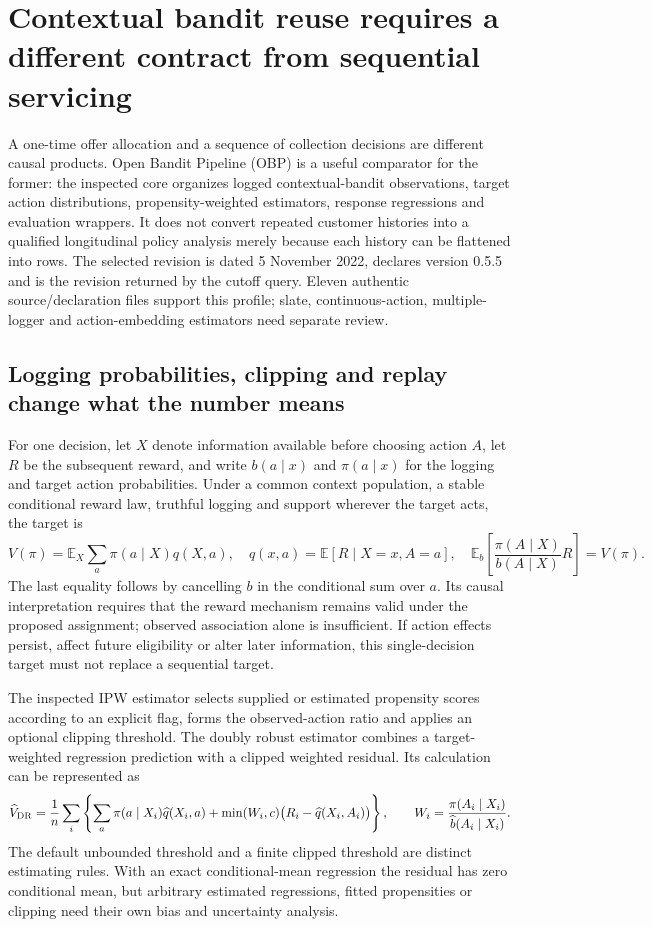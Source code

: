 \section{Contextual bandit reuse requires a different contract from sequential servicing}
\label{exec23:obp-scope}
A one-time offer allocation and a sequence of collection decisions are different
causal products. Open Bandit Pipeline (OBP) is a useful comparator for the former:
the inspected core organizes logged contextual-bandit observations, target
action distributions, propensity-weighted estimators, response regressions and
evaluation wrappers. It does not convert repeated customer histories into a
qualified longitudinal policy analysis merely because each history can be
flattened into rows. The selected revision is dated 5 November 2022, declares
version 0.5.5 and is the revision returned by the cutoff query. Eleven authentic
source/declaration files support this profile; slate, continuous-action,
multiple-logger and action-embedding estimators need separate review.
\citep{exec23_obp_sources}

\subsection{Logging probabilities, clipping and replay change what the number means}
\label{exec23:obp-target}
For one decision, let $X$ denote information available before choosing action
$A$, let $R$ be the subsequent reward, and write $b(a\mid x)$ and
$\pi(a\mid x)$ for the logging and target action probabilities. Under a common
context population, a stable conditional reward law, truthful logging and
support wherever the target acts, the target is
\[
 V(\pi)=\mathbb E_X\sum_a\pi(a\mid X)q(X,a),
 \quad q(x,a)=\mathbb E[R\mid X=x,A=a],
 \quad \mathbb E_b\!\left[\frac{\pi(A\mid X)}{b(A\mid X)}R\right]=V(\pi).
\]
The last equality follows by cancelling $b$ in the conditional sum over $a$.
Its causal interpretation requires that the reward mechanism remains valid
under the proposed assignment; observed association alone is insufficient.
If action effects persist, affect future eligibility or alter later information,
this single-decision target must not replace a sequential target.

The inspected IPW estimator selects supplied or estimated propensity scores
according to an explicit flag, forms the observed-action ratio and applies an
optional clipping threshold. The doubly robust estimator combines a
target-weighted regression prediction with a clipped weighted residual. Its
calculation can be represented as
\[
 \widehat V_{\rm DR}=\frac1n\sum_i\left\{
 \sum_a\pi(a\mid X_i)\widehat q(X_i,a)
 +\min(W_i,c)\big(R_i-\widehat q(X_i,A_i)\big)\right\},
 \qquad W_i=\frac{\pi(A_i\mid X_i)}{\widehat b(A_i\mid X_i)}.
\]
The default unbounded threshold and a finite clipped threshold are distinct
estimating rules. With an exact conditional-mean regression the residual has
zero conditional mean, but arbitrary estimated regressions, fitted propensities
or clipping need their own bias and uncertainty analysis.
\citep{exec23_obp_sources}

